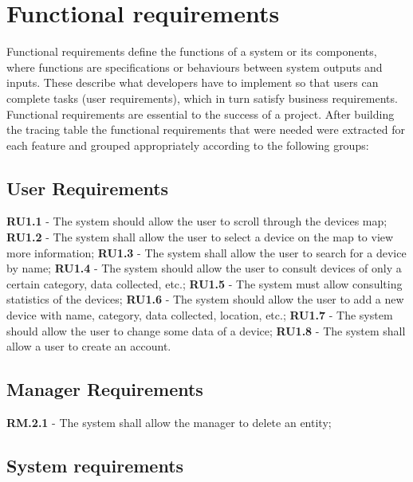 \documentclass{scrreprt}
\begin{document}
\section{Functional requirements}

Functional requirements define the functions of a system or its components,
where functions are specifications or behaviours between system outputs and
inputs. \cite{fulton2017chapter} These describe what developers have to implement
so that users can complete tasks (user requirements), which in turn satisfy
business requirements. \cite{wiegers2013software} Functional requirements are
essential to the success of a project.
After building the tracing table the functional requirements that were needed
were extracted for each feature and grouped appropriately according to the
following groups:

\subsection{User Requirements}

\textbf{RU1.1} - The system should allow the user to scroll through the devices map;
\newline
\textbf{RU1.2} - The system shall allow the user to select a device on the map to view more information;
\newline
\textbf{RU1.3} - The system shall allow the user to search for a device by name;
\newline
\textbf{RU1.4} - The system should allow the user to consult devices of only a certain category, data collected, etc.;
\newline
\textbf{RU1.5} - The system must allow consulting statistics of the devices;
\newline
\textbf{RU1.6} - The system should allow the user to add a new device with name, category, data collected, location, etc.;
\newline
\textbf{RU1.7} - The system should allow the user to change some data of a device;
\newline
\textbf{RU1.8} - The system shall allow a user to create an account.

\subsection{Manager Requirements}

\textbf{RM.2.1} - The system shall allow the manager to delete an entity;

\subsection{System requirements}
\end{document}
